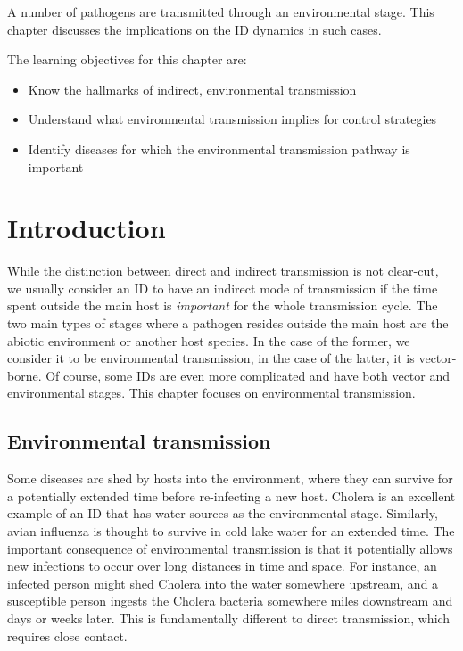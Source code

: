 \documentclass[]{book}
\providecommand{\tightlist}{%
  \setlength{\itemsep}{0pt}\setlength{\parskip}{0pt}}
\theoremstyle{definition}
\theoremstyle{definition}
\theoremstyle{definition}
\theoremstyle{remark}
\begin{document}
A number of pathogens are transmitted through an environmental stage.
This chapter discusses the implications on the ID dynamics in such
cases.

The learning objectives for this chapter are:

\begin{itemize}
\tightlist
\item
  Know the hallmarks of indirect, environmental transmission
\item
  Understand what environmental transmission implies for control
  strategies
\item
  Identify diseases for which the environmental transmission pathway is
  important
\end{itemize}

\section{Introduction}\label{introduction-6}

While the distinction between direct and indirect transmission is not
clear-cut, we usually consider an ID to have an indirect mode of
transmission if the time spent outside the main host is \emph{important}
for the whole transmission cycle. The two main types of stages where a
pathogen resides outside the main host are the abiotic environment or
another host species. In the case of the former, we consider it to be
environmental transmission, in the case of the latter, it is
vector-borne. Of course, some IDs are even more complicated and have
both vector and environmental stages. This chapter focuses on
environmental transmission.

\subsection{Environmental
transmission}\label{environmental-transmission-2}

Some diseases are shed by hosts into the environment, where they can
survive for a potentially extended time before re-infecting a new host.
Cholera is an excellent example of an ID that has water sources as the
environmental stage. Similarly, avian influenza is thought to survive in
cold lake water for an extended time. The important consequence of
environmental transmission is that it potentially allows new infections
to occur over long distances in time and space. For instance, an
infected person might shed Cholera into the water somewhere upstream,
and a susceptible person ingests the Cholera bacteria somewhere miles
downstream and days or weeks later. This is fundamentally different to
direct transmission, which requires close contact.
\end{document}
